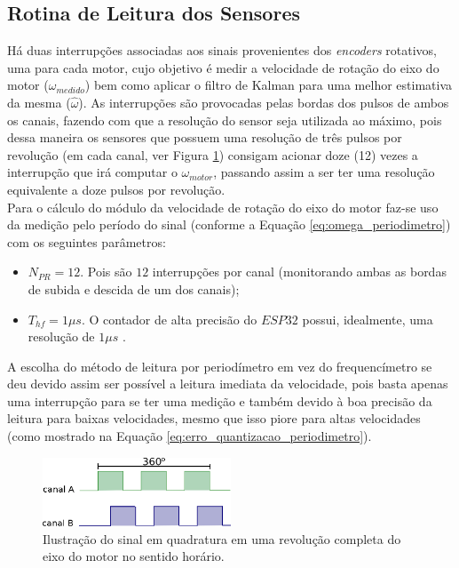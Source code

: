 \subsection{Rotina de Leitura dos Sensores}
\label{subsec:rotina_sensores}

Há duas interrupções associadas aos sinais provenientes dos \emph{encoders} rotativos, uma para cada motor, cujo objetivo é medir a velocidade de rotação do eixo do motor ($\omega_{medido}$) bem como aplicar o filtro de Kalman para uma melhor estimativa da mesma ($\hat{\omega}$). As interrupções são provocadas pelas bordas dos pulsos de ambos os canais, fazendo com que a resolução do sensor seja utilizada ao máximo, pois dessa maneira os sensores que possuem uma resolução de três pulsos por revolução (em cada canal, ver Figura \ref{fig:ilustracao_uma_revolucao}) consigam acionar doze (12) vezes a interrupção que irá computar o $\omega_{motor}$, passando assim a ser ter uma resolução equivalente a doze pulsos por revolução.\\

Para o cálculo do módulo da velocidade de rotação do eixo do motor faz-se uso da medição pelo período do sinal (conforme a Equação \ref{eq:omega_periodimetro}) com os seguintes parâmetros:

\begin{itemize}
    \item $N_{PR} = 12$. Pois são $12$ interrupções por canal (monitorando ambas as bordas de subida e descida de um dos canais);
    \item $T_{hf} = 1\mu{}s$. O contador de alta precisão do $ESP32$ possui, idealmente, uma resolução de $1\mu{}s$ \cite{esp}.
\end{itemize}

A escolha do método de leitura por periodímetro em vez do frequencímetro se deu devido assim ser possível a leitura imediata da velocidade, pois basta apenas uma interrupção para se ter uma medição e também devido à boa precisão da leitura para baixas velocidades, mesmo que isso piore para altas velocidades (como mostrado na Equação \ref{eq:erro_quantizacao_periodimetro}).

\begin{figure}[H]
    \centering
    \includegraphics[width=0.5\textwidth]{figuras/ilustracoes/sinal_enquadratura_uma_revolucao.eps}
    \caption{Ilustração do sinal em quadratura em uma revolução completa do eixo do motor no sentido horário.}
    \label{fig:ilustracao_uma_revolucao}
\end{figure}

